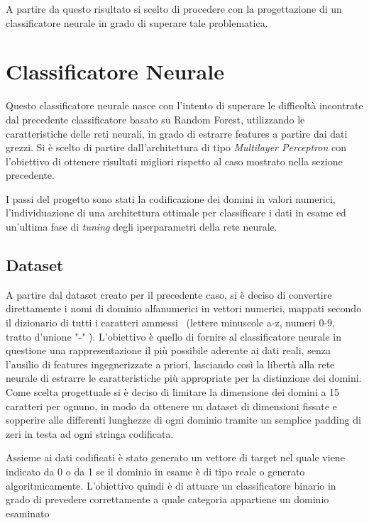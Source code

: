 A partire da questo risultato si scelto di procedere con la progettazione di un classificatore neurale in grado di superare tale problematica.

\newpage
\section{Classificatore Neurale}
\label{classificatorenn}
Questo classificatore neurale nasce con l'intento di superare le difficoltà incontrate dal precedente classificatore basato su Random Forest, utilizzando le caratteristiche delle reti neurali, in grado di estrarre features a partire dai dati grezzi. Si è scelto di partire dall'architettura di tipo \textit{Multilayer Perceptron} con l'obiettivo di ottenere risultati migliori rispetto al caso mostrato nella sezione precedente.

I passi del progetto sono stati la codificazione dei domini in valori numerici, l'individuazione di una architettura ottimale per classificare i dati in esame ed un'ultima fase di \textit{tuning} degli iperparametri della rete neurale. 

\subsection{Dataset}
\label{classificatorenninput}
A partire dal dataset creato per il precedente caso, si è deciso di convertire direttamente i nomi di dominio alfanumerici in vettori numerici, mappati secondo il dizionario di tutti i caratteri ammessi~\cite{icann} (lettere minuscole a-z, numeri 0-9, tratto d'unione "-" ). L'obiettivo è quello di fornire al classificatore neurale in questione una rappresentazione il più possibile aderente ai dati reali, senza l'ausilio di features ingegnerizzate a priori, lasciando così la libertà alla rete neurale di estrarre le caratteristiche più appropriate per la distinzione dei domini. Come scelta progettuale si è deciso di limitare la dimensione dei domini a 15 caratteri per ognuno, in modo da ottenere un dataset di dimensioni fissate e sopperire alle differenti lunghezze di ogni dominio tramite un semplice padding di zeri in testa ad ogni stringa codificata.

Assieme ai dati codificati è stato generato un vettore di target nel quale viene indicato da 0 o da 1 se il dominio in esame è di tipo reale o generato algoritmicamente. L'obiettivo quindi è di attuare un classificatore binario in grado di prevedere correttamente a quale categoria appartiene un dominio esaminato 

